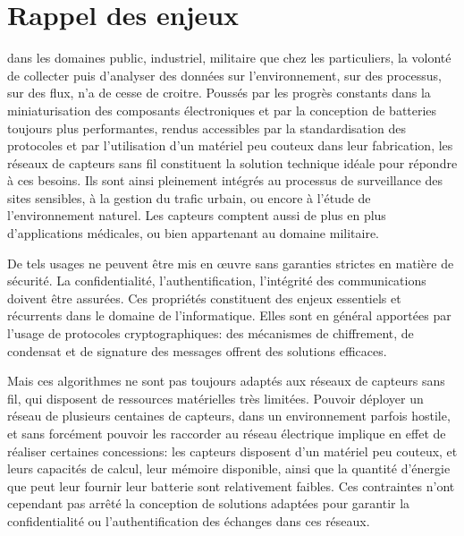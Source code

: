 \section{Rappel des enjeux}

 dans les domaines public, industriel, militaire que chez les particuliers, la volonté de collecter puis d'analyser des données sur l'environnement, sur des processus, sur des flux, n'a de cesse de croitre.
Poussés par les progrès constants dans la miniaturisation des composants électroniques et par la conception de batteries toujours plus performantes, rendus accessibles par la standardisation des protocoles et par l'utilisation d'un matériel peu couteux dans leur fabrication, les réseaux de capteurs sans fil constituent la solution technique idéale pour répondre à ces besoins.
Ils sont ainsi pleinement intégrés au processus de surveillance des sites sensibles, à la gestion du trafic urbain, ou encore à l'étude de l'environnement naturel.
Les capteurs comptent aussi de plus en plus d'applications médicales, ou bien appartenant au domaine militaire.

De tels usages ne peuvent être mis en œuvre sans garanties strictes en matière de sécurité.
La confidentialité, l'authentification, l'intégrité des communications doivent être assurées.
Ces propriétés constituent des enjeux essentiels et récurrents dans le domaine de l'informatique.
Elles sont en général apportées par l'usage de protocoles cryptographiques: des mécanismes de chiffrement, de condensat et de signature des messages offrent des solutions efficaces.

Mais ces algorithmes ne sont pas toujours adaptés aux réseaux de capteurs sans fil, qui disposent de ressources matérielles très limitées.
Pouvoir déployer un réseau de plusieurs centaines de capteurs, dans un environnement parfois hostile, et sans forcément pouvoir les raccorder au réseau électrique implique en effet de réaliser certaines concessions: les capteurs disposent d'un matériel peu couteux, et leurs capacités de calcul, leur mémoire disponible, ainsi que la quantité d'énergie que peut leur fournir leur batterie sont relativement faibles.
Ces contraintes n'ont cependant pas arrêté la conception de solutions adaptées pour garantir la confidentialité ou l'authentification des échanges dans ces réseaux.

